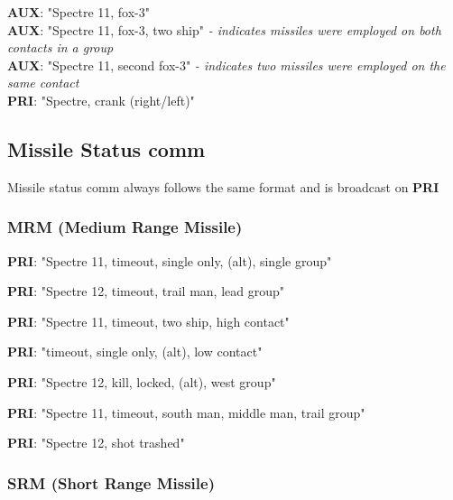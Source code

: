 \textbf{AUX}: "Spectre 11, fox-3" \\
\textbf{AUX}: "Spectre 11, fox-3, two ship" \textit{- indicates missiles were
employed on both contacts in a group} \\
\textbf{AUX}: "Spectre 11, second fox-3" \textit{- indicates two missiles were
employed on the same contact} \\
\textbf{PRI}: "Spectre, crank (right/left)"

\subsection*{Missile Status comm}

Missile status comm always follows the same format and is broadcast on
\textbf{PRI}


\subsubsection*{MRM (Medium Range Missile)}

\textbf{PRI}: "Spectre 11, timeout, single only, (alt), single group"

\textbf{PRI}: "Spectre 12, timeout, trail man, lead group"


\textbf{PRI}: "Spectre 11, timeout, two ship, high contact"

\textbf{PRI}: "timeout, single only, (alt), low contact"

\textbf{PRI}: "Spectre 12, kill, locked, (alt), west group"

\textbf{PRI}: "Spectre 11, timeout, south man, middle man, trail group"

\textbf{PRI}: "Spectre 12, shot trashed"

\subsubsection*{SRM (Short Range Missile)}

